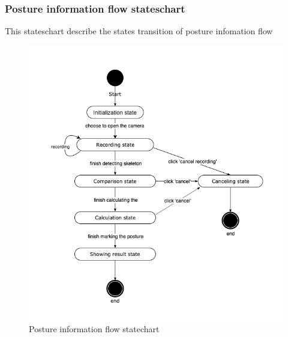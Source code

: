 \documentclass[16pt]{scrreprt}
\begin{document}
\subsubsection{Posture information flow stateschart}

This stateschart describe the states transition of posture infomation flow

\begin{figure}[H]
    \centering
    \includegraphics[width=1.0\textwidth]{figures/stateschart3.png}
    \caption{Posture information flow statechart}
\end{figure}
\end{document}
